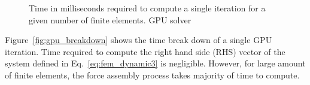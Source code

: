 \documentclass[en]{minipw} %
\begin{document}
\begin{figure}[H]   
		\caption{Time in milliseconds required to compute a single iteration for a given number of finite elements. GPU solver}
        \label{fig:gpu}
    \end{figure}

Figure~\ref{fig:gpu_breakdown} shows the time break down of a single GPU iteration. Time required to compute the right hand side (RHS) vector of the system defined in Eq.~\ref{eq:fem_dynamic3} is negligible. However, for large amount of finite elements, the force assembly process takes majority of time to compute.
\end{document}
